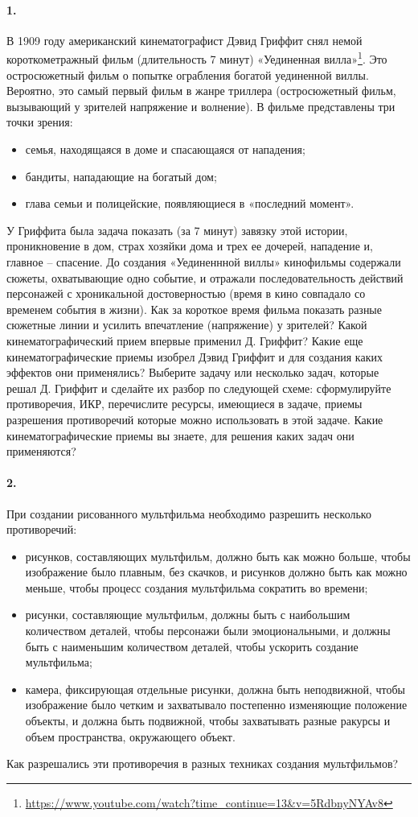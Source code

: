 \documentclass[11pt,a4paper]{article}
\begin{document}
\paragraph{1.}
В 1909 году американский кинематографист Дэвид Гриффит снял немой
короткометражный фильм (длительность 7 минут) «Уединенная
вилла»\footnote{\url{https://www.youtube.com/watch?time_continue=13&v=5RdbnyNYAv8}}. Это
остросюжетный фильм о попытке ограбления богатой уединенной виллы. Вероятно,
это самый первый фильм в жанре триллера (остросюжетный фильм, вызывающий у
зрителей напряжение и волнение). В фильме представлены три точки зрения:
\begin{itemize}
  \item семья, находящаяся в доме и спасающаяся от нападения;
  \item бандиты, нападающие на богатый дом;
  \item глава семьи и полицейские, появляющиеся в «последний момент».
\end{itemize}
У Гриффита была задача показать (за 7 минут) завязку этой истории,
проникновение в дом, страх хозяйки дома и трех ее дочерей, нападение и,
главное – спасение. До создания «Уединеннной виллы» кинофильмы содержали
сюжеты, охватывающие одно событие, и отражали последовательность действий
персонажей с хроникальной достоверностью (время в кино совпадало со временем
события в жизни). Как за короткое время фильма показать разные сюжетные линии
и усилить впечатление (напряжение) у зрителей? Какой кинематографический прием
впервые применил Д. Гриффит? Какие еще кинематографические приемы изобрел
Дэвид Гриффит и для создания каких эффектов они применялись? Выберите задачу
или несколько задач, которые решал Д. Гриффит и сделайте их разбор по
следующей схеме: сформулируйте противоречия, ИКР, перечислите ресурсы,
имеющиеся в задаче, приемы разрешения противоречий которые можно использовать
в этой задаче. Какие кинематографические приемы вы знаете, для решения каких
задач они применяются?

\paragraph{2.}
При создании рисованного мультфильма необходимо разрешить несколько противоречий:
\begin{itemize}
\item рисунков, составляющих мультфильм, должно быть как можно больше, чтобы
  изображение было плавным, без скачков, и рисунков должно быть как можно
  меньше, чтобы процесс создания мультфильма сократить во времени;
\item рисунки, составляющие мультфильм, должны быть с наибольшим количеством
  деталей, чтобы персонажи были эмоциональными, и должны быть с наименьшим
  количеством деталей, чтобы ускорить создание мультфильма;
\item камера, фиксирующая отдельные рисунки, должна быть неподвижной, чтобы
  изображение было четким и захватывало постепенно изменяющие положение
  объекты, и должна быть подвижной, чтобы захватывать разные ракурсы и объем
  пространства, окружающего объект.
\end{itemize}
Как разрешались эти противоречия в разных техниках создания мультфильмов?
\end{document}

